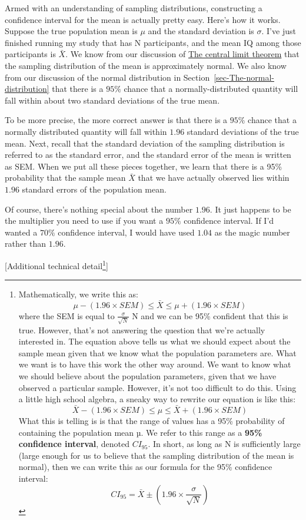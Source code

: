 \documentclass[
  a4paper,
]{book}
\begin{document}
Armed with an understanding of sampling distributions, constructing a
confidence interval for the mean is actually pretty easy. Here's how it
works. Suppose the true population mean is \(\mu\) and the standard
deviation is \(\sigma\). I've just finished running my study that has N
participants, and the mean IQ among those participants is \(\bar{X}\).
We know from our discussion of
\protect\hyperlink{sec-The-central-limit-theorem}{The central limit
theorem} that the sampling distribution of the mean is approximately
normal. We also know from our discussion of the normal distribution in
Section~\ref{sec-The-normal-distribution} that there is a \(95\%\)
chance that a normally-distributed quantity will fall within about two
standard deviations of the true mean.

To be more precise, the more correct answer is that there is a \(95\%\)
chance that a normally distributed quantity will fall within \(1.96\)
standard deviations of the true mean. Next, recall that the standard
deviation of the sampling distribution is referred to as the standard
error, and the standard error of the mean is written as SEM. When we put
all these pieces together, we learn that there is a 95\% probability
that the sample mean \(\bar{X}\) that we have actually observed lies
within \(1.96\) standard errors of the population mean.

Of course, there's nothing special about the number \(1.96\). It just
happens to be the multiplier you need to use if you want a \(95\%\)
confidence interval. If I'd wanted a \(70\%\) confidence interval, I
would have used \(1.04\) as the magic number rather than \(1.96\).

{[}Additional technical detail\footnote{Mathematically, we write this
  as:
  \[\mu-(1.96 \times SEM ) \leq \bar{X} \leq \mu + (1.96 \times SEM)\]
  where the SEM is equal to \(\frac{\sigma}{\sqrt{N}}\) N and we can be
  95\% confident that this is true. However, that's not answering the
  question that we're actually interested in. The equation above tells
  us what we should expect about the sample mean given that we know what
  the population parameters are. What we want is to have this work the
  other way around. We want to know what we should believe about the
  population parameters, given that we have observed a particular
  sample. However, it's not too difficult to do this. Using a little
  high school algebra, a sneaky way to rewrite our equation is like
  this:
  \[\bar{X}-(1.96 \times SEM ) \leq \mu \leq \bar{X}+(1.96 \times SEM )\]
  What this is telling is is that the range of values has a 95\%
  probability of containing the population mean µ. We refer to this
  range as a \textbf{95\% confidence interval}, denoted \(CI_{95}\). In
  short, as long as N is sufficiently large (large enough for us to
  believe that the sampling distribution of the mean is normal), then we
  can write this as our formula for the 95\% confidence interval:
  \[CI_{95}=\bar{X} \pm (1.96 \times \frac{\sigma}{\sqrt{N}})\]}{]}
\end{document}
